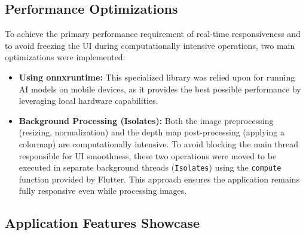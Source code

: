 \subsection{Performance Optimizations}
\label{subsec:app_optimizations}

To achieve the primary performance requirement of real-time responsiveness and to avoid freezing the UI during computationally intensive operations, two main optimizations were implemented:
\begin{itemize}
    \item \textbf{Using onnxruntime:} This specialized library was relied upon for running AI models on mobile devices, as it provides the best possible performance by leveraging local hardware capabilities.
    \item \textbf{Background Processing (Isolates):} Both the image preprocessing (resizing, normalization) and the depth map post-processing (applying a colormap) are computationally intensive. To avoid blocking the main thread responsible for UI smoothness, these two operations were moved to be executed in separate background threads (\texttt{Isolates}) using the \texttt{compute} function provided by Flutter. This approach ensures the application remains fully responsive even while processing images.
\end{itemize}

\subsection{Application Features Showcase}
\label{subsec:app_features}

